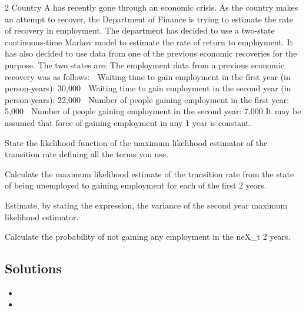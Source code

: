2 Country A has recently gone through an economic crisis. As the country makes an
attempt to recover, the Department of Finance is trying to estimate the rate of
recovery in employment. The department has decided to use a two-state
continuous-time Markov model to estimate the rate of return to employment. It has
also decided to use data from one of the previous economic recoveries for the
purpose. The two states are:
The employment data from a previous economic recovery was as follows:
 Waiting time to gain employment in the first year (in person-years): 30,000
 Waiting time to gain employment in the second year (in person-years): 22,000
 Number of people gaining employment in the first year: 5,000
 Number of people gaining employment in the second year: 7,000
It may be assumed that force of gaining employment in any 1 year is constant.
\item   State the likelihood function of the maximum likelihood estimator of the
transition rate defining all the terms you use. 
\item   Calculate the maximum likelihood estimate of the transition rate from the state
of being unemployed to gaining employment for each of the first 2 years. 
\item  Estimate, by stating the expression, the variance of the second year maximum
likelihood estimator. 
\item  Calculate the probability of not gaining any employment in the neX_{t} 2 years.

\subsection*{Solutions}

\begin{itemize}
\item
\item
\end{itemize}


